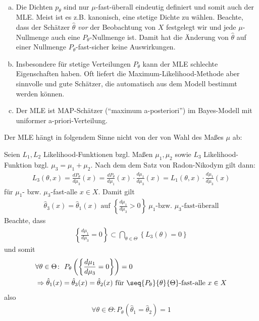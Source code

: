 \documentclass[a4paper]{scrartcl}
\begin{document}
		\begin{remark}~\\
			\begin{enumerate}[a)]
				\item Die Dichten $p_\theta$ sind nur $\mu$-fast-überall eindeutig definiert und somit auch der MLE. Meist ist es z.B. kanonisch, eine stetige Dichte zu wählen. Beachte, dass der Schätzer $\hat{\theta}$ \emph{vor} der Beobachtung von $X$ festgelegt wir und jede $\mu$-Nullmenge auch eine $P_\theta$-Nullmenge ist. Damit hat die Änderung von $\hat{\theta}$ auf einer Nullmenge $P_\theta$-fast-sicher keine Auswirkungen.
				\item Insbesondere für stetige Verteilungen $P_\theta$ kann der MLE schlechte Eigenschaften haben. Oft liefert die Maximum-Likelihood-Methode aber sinnvolle und gute Schätzer, die automatisch aus dem Modell bestimmt werden können.
				\item Der MLE ist MAP-Schätzer ("`maximum a-posteriori"') im Bayes-Modell mit uniformer a-priori-Verteilung.
			\end{enumerate}
		\end{remark}
		\begin{remark}
			Der MLE hängt in folgendem Sinne nicht von der von Wahl des Maßes $\mu$ ab:
			
			Seien $L_1,L_2$ Likelihood-Funktionen bzgl. Maßen $\mu_1,\mu_2$ sowie $L_3$ Likelihood-Funktion bzgl. $\mu_3=\mu_1+\mu_2$. Nach dem dem Satz von Radon-Nikodym gilt dann:
			\begin{align*}
				L_3(\theta,x)=\frac{dP_\theta}{d\mu_3}(x)=\frac{dP_\theta}{d\mu_1	}(x)\cdot\frac{d\mu_1}{d\mu_3}(x)=L_1(\theta,x)\cdot \frac{d\mu_1}{d\mu_3}(x)
			\end{align*}
			für $\mu_1$- bzw. $\mu_3$-fast-alle $x\in X$. Damit gilt
			\begin{align*}
				\hat{\theta}_3(x)=\hat{\theta}_1(x)\text{ auf }\left\{\frac{d\mu_1}{d\mu_3}>0\right\}~\mu_1\text{-bzw. }\mu_3\text{-fast-überall}
			\end{align*}
			Beachte, dass
			\begin{align*}
				\left\{\frac{d\mu_1}{d\mu_3}=0\right\}\subset\bigcap_{\theta\in\Theta}\left\{L_3(\theta)=0\right\}
			\end{align*}
			und somit
			\begin{align*}
				&\forall \theta\in\Theta\colon~P_\theta\left(\left\{\frac{d\mu_1}{d\mu_3}=0\right\}\right)=0\\
				&\Rightarrow \hat{\theta}_1(x)=\hat{\theta}_3(x)=\hat{\theta}_2(x)\text{ für }\seq{P_\theta}{\theta}{\Theta}\text{-fast-alle }x\in X
			\end{align*}
			also
			\begin{align*}
				\forall\theta\in\Theta\colon P_\theta \left(\hat{\theta}_1=\hat{\theta}_2\right)=1
			\end{align*}
		\end{remark}
\end{document}
